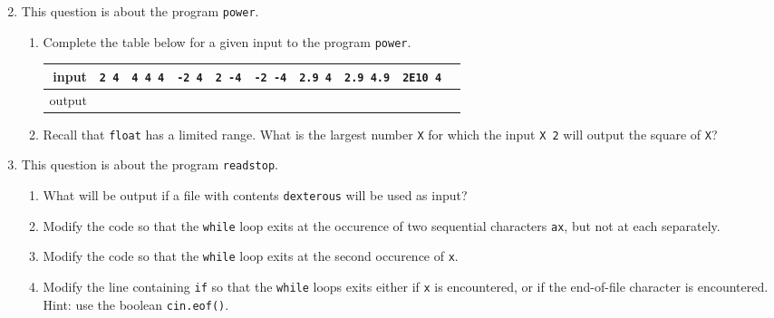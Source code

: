 \documentclass[a4paper,12pt]{article}
\begin{document}
\vfill
\begin{enumerate}
\setcounter{enumi}{1}
\item This question is about the program \texttt{power}.
\begin{enumerate}
\item Complete the table below for a given input to the program \texttt{power}.
\begin{center}
\renewcommand\arraystretch{1.5}
\begin{tabular}{|r|c|c|c|c|c|c|c|c|c|}
\hline input & \texttt{2\ 4} &  \texttt{4\ 4\ 4} & \texttt{-2\ 4} & \texttt{2\ -4} & \texttt{-2\ -4} & \texttt{2.9\ 4} & \texttt{2.9 4.9} & \texttt{2E10 4}\\
\hline output &&&&&&&& \\
\hline
\end{tabular}
\end{center}
\item Recall that \texttt{float} has a limited range. What is the largest number \texttt{X} for which the input \texttt{X 2} will output the square of \texttt{X}?
\end{enumerate}

\vfill
\item This question is about the program \texttt{readstop}.
\begin{enumerate}
\item What will be output if a file with contents \texttt{dexterous} will be used as input?
\item Modify the code so that the \texttt{while} loop exits at the occurence of two sequential characters \texttt{ax}, but not at each separately.
\item Modify the code so that the \texttt{while} loop exits at the second occurence of \texttt{x}.
\item Modify the line containing \texttt{if} so that the \texttt{while} loops exits either if \texttt{x} is encountered, or if the end-of-file character is encountered. Hint: use the boolean \texttt{cin.eof()}.
\end{enumerate}


\clearpage


\end{enumerate}
\end{document}
